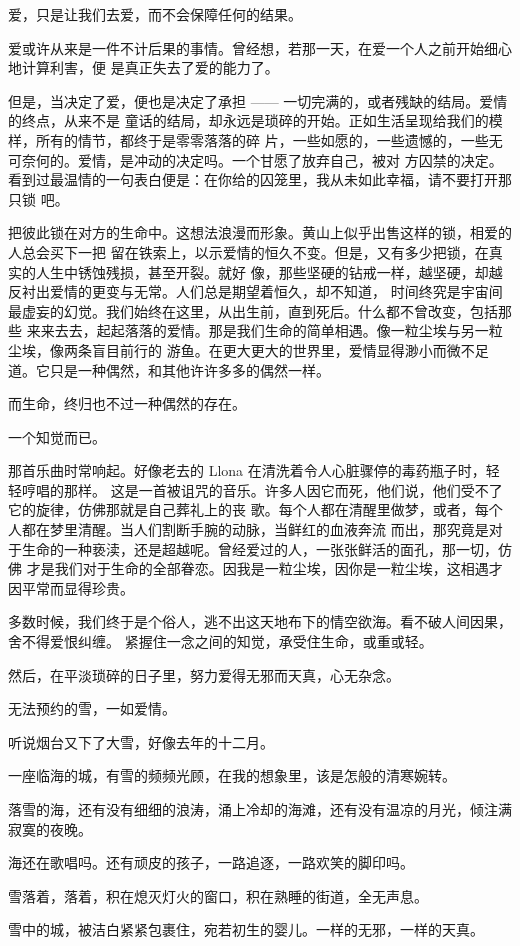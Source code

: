 		爱，只是让我们去爱，而不会保障任何的结果。

		爱或许从来是一件不计后果的事情。曾经想，若那一天，在爱一个人之前开始细心地计算利害，便
	是真正失去了爱的能力了。

		但是，当决定了爱，便也是决定了承担 —— 一切完满的，或者残缺的结局。爱情的终点，从来不是
	童话的结局，却永远是琐碎的开始。正如生活呈现给我们的模样，所有的情节，都终于是零零落落的碎
	片，一些如愿的，一些遗憾的，一些无可奈何的。爱情，是冲动的决定吗。一个甘愿了放弃自己，被对
	方囚禁的决定。看到过最温情的一句表白便是：在你给的囚笼里，我从未如此幸福，请不要打开那只锁
	吧。

		把彼此锁在对方的生命中。这想法浪漫而形象。黄山上似乎出售这样的锁，相爱的人总会买下一把
	留在铁索上，以示爱情的恒久不变。但是，又有多少把锁，在真实的人生中锈蚀残损，甚至开裂。就好
	像，那些坚硬的钻戒一样，越坚硬，却越反衬出爱情的更变与无常。人们总是期望着恒久，却不知道，
	时间终究是宇宙间最虚妄的幻觉。我们始终在这里，从出生前，直到死后。什么都不曾改变，包括那些
	来来去去，起起落落的爱情。那是我们生命的简单相遇。像一粒尘埃与另一粒尘埃，像两条盲目前行的
	游鱼。在更大更大的世界里，爱情显得渺小而微不足道。它只是一种偶然，和其他许许多多的偶然一样。

		而生命，终归也不过一种偶然的存在。

		一个知觉而已。

		那首乐曲时常响起。好像老去的 Llona 在清洗着令人心脏骤停的毒药瓶子时，轻轻哼唱的那样。
	这是一首被诅咒的音乐。许多人因它而死，他们说，他们受不了它的旋律，仿佛那就是自己葬礼上的丧
	歌。每个人都在清醒里做梦，或者，每个人都在梦里清醒。当人们割断手腕的动脉，当鲜红的血液奔流
	而出，那究竟是对于生命的一种亵渎，还是超越呢。曾经爱过的人，一张张鲜活的面孔，那一切，仿佛
	才是我们对于生命的全部眷恋。因我是一粒尘埃，因你是一粒尘埃，这相遇才因平常而显得珍贵。

		多数时候，我们终于是个俗人，逃不出这天地布下的情空欲海。看不破人间因果，舍不得爱恨纠缠。
	紧握住一念之间的知觉，承受住生命，或重或轻。

		然后，在平淡琐碎的日子里，努力爱得无邪而天真，心无杂念。

	\endwriting



		无法预约的雪，一如爱情。


		听说烟台又下了大雪，好像去年的十二月。\par
		一座临海的城，有雪的频频光顾，在我的想象里，该是怎般的清寒婉转。\par
		落雪的海，还有没有细细的浪涛，涌上冷却的海滩，还有没有温凉的月光，倾注满寂寞的夜晚。\par
		海还在歌唱吗。还有顽皮的孩子，一路追逐，一路欢笑的脚印吗。\par
		雪落着，落着，积在熄灭灯火的窗口，积在熟睡的街道，全无声息。\par
		雪中的城，被洁白紧紧包裹住，宛若初生的婴儿。一样的无邪，一样的天真。

